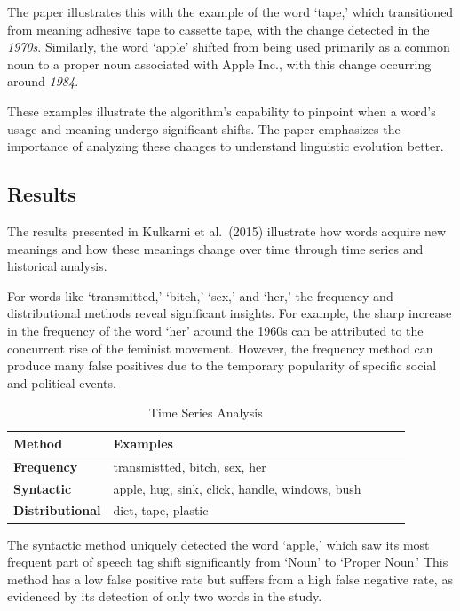 The paper illustrates this with the example of the word `tape,' which transitioned from meaning adhesive tape to cassette tape, with the change detected in the \emph{1970s}.
Similarly, the word `apple' shifted from being used primarily as a common noun to a proper noun associated with Apple Inc., with this change occurring around \emph{1984}.

These examples illustrate the algorithm’s capability to pinpoint when a word’s usage and meaning undergo significant shifts.
The paper emphasizes the importance of analyzing these changes to understand linguistic evolution better.

\subsection{Results} \label{subsec:kulkarni-results}

The results presented in Kulkarni et al.\ (2015) illustrate how words acquire new meanings and how these meanings change over time through time series and historical analysis.

For words like `transmitted,' `bitch,' `sex,' and `her,' the frequency and distributional methods reveal significant insights.
For example, the sharp increase in the frequency of the word `her' around the 1960s can be attributed to the concurrent rise of the feminist movement.
However, the frequency method can produce many false positives due to the temporary popularity of specific social and political events.

\begin{table}[tbh]
\begin{tabular}{@{}lllll@{}}
\toprule
\textbf{Method}         & \textbf{Examples}                              &  &  &  \\ \midrule
\textbf{Frequency}      & transmistted, bitch, sex, her                  &  &  &  \\
\textbf{Syntactic}      & apple, hug, sink, click, handle, windows, bush &  &  &  \\
\textbf{Distributional} & diet, tape, plastic                            &  &  &  \\ \bottomrule
\end{tabular}
\caption{Time Series Analysis}
\label{tab:time-series-examples}
\end{table}
\raggedbottom

The syntactic method uniquely detected the word `apple,' which saw its most frequent part of speech tag shift significantly from `Noun' to `Proper Noun.'
This method has a low false positive rate but suffers from a high false negative rate, as evidenced by its detection of only two words in the study.

